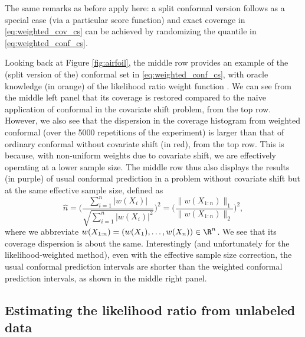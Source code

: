 \documentclass{article}
\begin{document}
The same remarks as before apply here: a split conformal version follows as a
special case (via a particular score function) and exact coverage in
\eqref{eq:weighted_cov_cs} can be achieved by randomizing the quantile in 
\eqref{eq:weighted_conf_cs}.

Looking back at Figure \ref{fig:airfoil}, the middle row provides an example of
the (split version of the) conformal set in \eqref{eq:weighted_conf_cs}, with
oracle knowledge (in orange) of the likelihood ratio weight function
. We can see from the middle left panel that its coverage
is restored compared to the naive application of conformal in the covariate
shift problem, from the top row. However, we also see that the dispersion in the
coverage histogram from weighted conformal (over the 5000 repetitions of the
experiment) is larger than that of ordinary conformal without covariate shift
(in red), from the top row. This is because, with non-uniform weights due to
covariate shift, we are effectively operating at a lower sample size. The middle
row thus also displays the results (in purple) of usual conformal prediction in
a problem without covariate shift but at the same effective sample size, defined
as
\[
\hat{n} = \bigg( \frac{\sum_{i=1}^n |w(X_i)|}{\sqrt{\sum_{i=1}^n |w(X_i)|^2}}
\bigg)^2 = \bigg( \frac{\|w(X_{1:n})\|_1}{\|w(X_{1:n})\|_2} \bigg)^2,
\]
where we abbreviate $w(X_{1:n})=(w(X_1),\ldots,w(X_n)) \in \R^n$. We see that
its coverage dispersion is about the same. Interestingly (and unfortunately for
the likelihood-weighted method), even with the effective sample size correction, 
the usual conformal prediction intervals are shorter than the weighted conformal
prediction intervals, as shown in the middle right panel.

\subsection{Estimating the likelihood ratio from unlabeled data}
\end{document}

